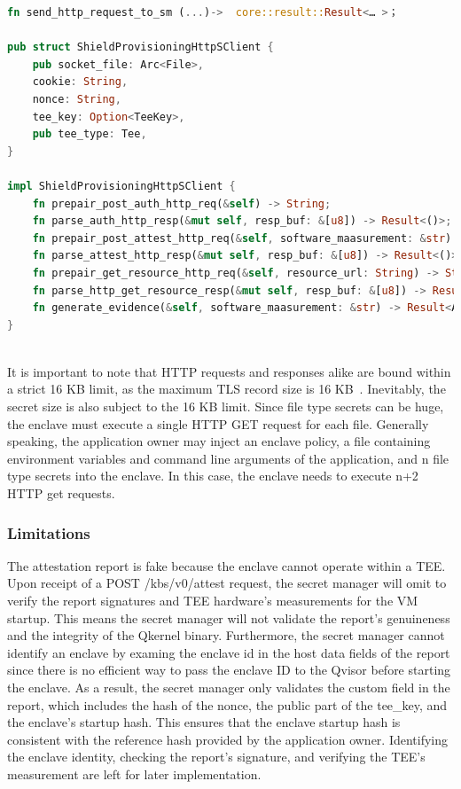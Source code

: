 \begin{lstlisting}[language=rust, caption= Functions for building the HTTP requests defined in the KBS attestation protocol, label={lst:http_connection}]
fn send_http_request_to_sm (...)->  core::result::Result<… >；

pub struct ShieldProvisioningHttpSClient {
    pub socket_file: Arc<File>,
    cookie: String,
    nonce: String,
    tee_key: Option<TeeKey>,
    pub tee_type: Tee,
}

impl ShieldProvisioningHttpSClient {
    fn prepair_post_auth_http_req(&self) -> String;
    fn parse_auth_http_resp(&mut self, resp_buf: &[u8]) -> Result<()>;
    fn prepair_post_attest_http_req(&self, software_maasurement: &str) -> Result<String>;
    fn parse_attest_http_resp(&mut self, resp_buf: &[u8]) -> Result<()>;
    fn prepair_get_resource_http_req(&self, resource_url: String) -> String;
    fn parse_http_get_resource_resp(&mut self, resp_buf: &[u8]) -> Result<Vec<u8>>;
    fn generate_evidence(&self, software_maasurement: &str) -> Result<Attestation>;
}
    
\end{lstlisting}

It is important to note that HTTP requests and responses alike are bound within a strict 16 KB limit, as the maximum TLS record size is 16 KB~\cite*{tls_record_size}. Inevitably, the secret size is also subject to the 16 KB limit. Since file type secrets can be huge, the 
enclave must execute a single HTTP GET request for each file. Generally speaking, the application owner may inject an enclave policy, a file containing environment variables and command line arguments of the application, and n file type secrets into the enclave. 
In this case, the enclave needs to execute n+2 HTTP get requests.

\subsubsection{Limitations}
\label{subsec:Limitations}

The attestation report is fake because the enclave cannot operate within a \acrshort{TEE}. Upon receipt of a POST /kbs/v0/attest request, the secret manager will omit to verify the report signatures and \acrshort{TEE} hardware's measurements for the VM startup. This means the secret manager will not validate the report's 
genuineness and the integrity of the Qkernel binary. Furthermore, the secret manager cannot identify an enclave by examing the enclave id in the host data fields of the report since there is no efficient way to pass the enclave ID to the Qvisor before starting the enclave. As a result, the secret 
manager only validates the custom field in the report, which includes the hash of the nonce, the public part of the tee\_key, and the enclave's startup hash. This ensures that the enclave startup hash is consistent with the reference hash provided by the application owner. Identifying the enclave 
identity, checking the report's signature, and verifying the \acrshort{TEE}'s measurement are left for later implementation.


